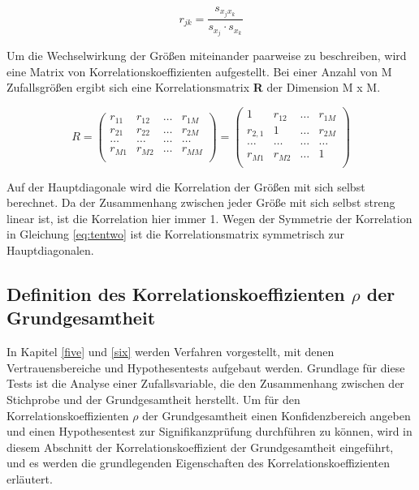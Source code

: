 \begin{equation}\label{eq:tenseven}
r_{jk} =\dfrac{s_{x_{j} x_{k}}}{s_{x_{j}} \cdot s_{x_{k}}} 
\end{equation}

\noindent Um die Wechselwirkung der Gr\"{o}{\ss}en miteinander paarweise zu beschreiben, wird eine Matrix von Korrelationskoeffizienten aufgestellt. Bei einer Anzahl von M Zufallsgr\"{o}{\ss}en ergibt sich eine Korrelationsmatrix \textbf{R} der Dimension M x M.

\begin{equation}\label{eq:teneight}
R=
\begin{pmatrix}
r_{11} & r_{12} & \dots & r_{1M}\\
r_{21} & r_{22} & \dots & r_{2M}\\
\dots & \dots & \dots & \dots \\
r_{M1} & r_{M2} & \dots & r_{MM}\\
\end{pmatrix} = 
\begin{pmatrix}
1 & r_{12} & \dots & r_{1M}\\
r_{2,1} & 1 & \dots & r_{2M}\\
\dots & \dots & \dots & \dots \\
r_{M1} & r_{M2} & \dots & 1\\
\end{pmatrix}
\end{equation}

\noindent Auf der Hauptdiagonale wird die Korrelation der Gr\"{o}{\ss}en mit sich selbst berechnet. Da der Zusammenhang zwischen jeder Gr\"{o}{\ss}e mit sich selbst streng linear ist, ist die Korrelation hier immer 1. Wegen der Symmetrie der Korrelation in Gleichung \eqref{eq:tentwo} ist die Korrelationsmatrix symmetrisch zur Hauptdiagonalen.

\clearpage

\subsection{Definition des Korrelationskoeffizienten \texorpdfstring{$\rho$}{Lg} der Grundgesamtheit}

\noindent In Kapitel \ref{five} und \ref{six} werden Verfahren vorgestellt, mit denen Vertrauensbereiche und Hypothesentests aufgebaut werden. Grundlage f\"{u}r diese Tests ist die Analyse einer Zufallsvariable, die den Zusammenhang zwischen der Stichprobe und der Grundgesamtheit herstellt. Um f\"{u}r den Korrelationskoeffizienten $\rho$ der Grundgesamtheit einen Konfidenzbereich angeben und einen Hypothesentest zur Signifikanzpr\"{u}fung durchf\"{u}hren zu k\"{o}nnen, wird in diesem Abschnitt der Korrelationskoeffizient der Grundgesamtheit eingef\"{u}hrt, und es werden die grundlegenden Eigenschaften des Korrelationskoeffizienten erl\"{a}utert.


